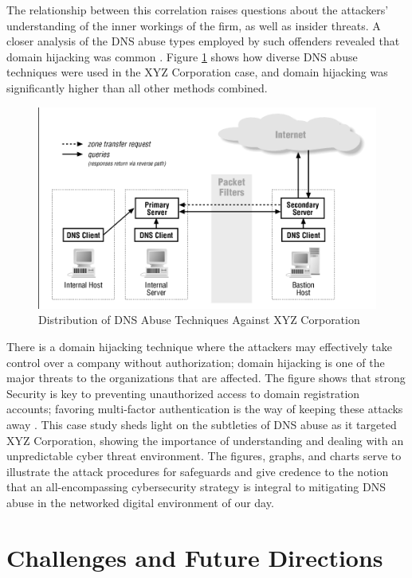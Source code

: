 The relationship between this correlation raises questions about the attackers' understanding of the inner workings of the firm, as well as insider threats. A closer analysis of the DNS abuse types employed by such offenders revealed that domain hijacking was common \cite{bayer2022study}. Figure \ref{fig:figureTwo} shows how diverse DNS abuse techniques were used in the XYZ Corporation case, and domain hijacking was significantly higher than all other methods combined.

\begin{figure}[ht]
\centering
\includegraphics{background/XYZ2.png}
\caption{Distribution of DNS Abuse Techniques Against XYZ Corporation}
\label{fig:figureTwo}
\end{figure}

There is a domain hijacking technique where the attackers may effectively take control over a company without authorization; domain hijacking is one of the major threats to the organizations that are affected. The figure shows that strong Security is key to preventing unauthorized access to domain registration accounts; favoring multi-factor authentication is the way of keeping these attacks away \cite{paz2020cyber}. This case study sheds light on the subtleties of DNS abuse as it targeted XYZ Corporation, showing the importance of understanding and dealing with an unpredictable cyber threat environment. The figures, graphs, and charts serve to illustrate the attack procedures for safeguards and give credence to the notion that an all-encompassing cybersecurity strategy is integral to mitigating DNS abuse in the networked digital environment of our day.

\section{Challenges and Future Directions}


